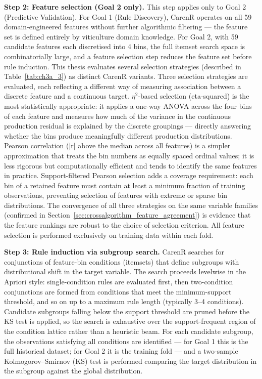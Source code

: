 \textbf{Step 2: Feature selection (Goal 2 only). }This step applies only to Goal 2 (Predictive Validation). For Goal 1 (Rule Discovery), CarenR operates on all 59 domain-engineered features without further algorithmic filtering --- the feature set is defined entirely by viticulture domain knowledge. For Goal 2, with 59 candidate features each discretised into 4 bins, the full itemset search space is combinatorially large, and a feature selection step reduces the feature set before rule induction. This thesis evaluates several selection strategies (described in Table~\ref{tab:ch3a_3}) as distinct CarenR variants. Three selection strategies are evaluated, each reflecting a different way of measuring association between a discrete feature and a continuous target. $\eta$$^2$-based selection (eta-squared) is the most statistically appropriate: it applies a one-way ANOVA across the four bins of each feature and measures how much of the variance in the continuous production residual is explained by the discrete groupings --- directly answering whether the bins produce meaningfully different production distributions. Pearson correlation (|r| above the median across all features) is a simpler approximation that treats the bin numbers as equally spaced ordinal values; it is less rigorous but computationally efficient and tends to identify the same features in practice. Support-filtered Pearson selection adds a coverage requirement: each bin of a retained feature must contain at least a minimum fraction of training observations, preventing selection of features with extreme or sparse bin distributions. The convergence of all three strategies on the same variable families (confirmed in Section~\ref{sec:crossalgorithm_feature_agreement}) is evidence that the feature rankings are robust to the choice of selection criterion. All feature selection is performed exclusively on training data within each fold.

\textbf{Step 3: Rule induction via subgroup search. }CarenR searches for conjunctions of feature-bin conditions (itemsets) that define subgroups with distributional shift in the target variable. The search proceeds levelwise in the Apriori style: single-condition rules are evaluated first, then two-condition conjunctions are formed from conditions that meet the minimum-support threshold, and so on up to a maximum rule length (typically 3--4 conditions). Candidate subgroups falling below the support threshold are pruned before the KS test is applied, so the search is exhaustive over the support-frequent region of the condition lattice rather than a heuristic beam. For each candidate subgroup, the observations satisfying all conditions are identified --- for Goal 1 this is the full historical dataset; for Goal 2 it is the training fold --- and a two-sample Kolmogorov--Smirnov (KS) test is performed comparing the target distribution in the subgroup against the global distribution.

